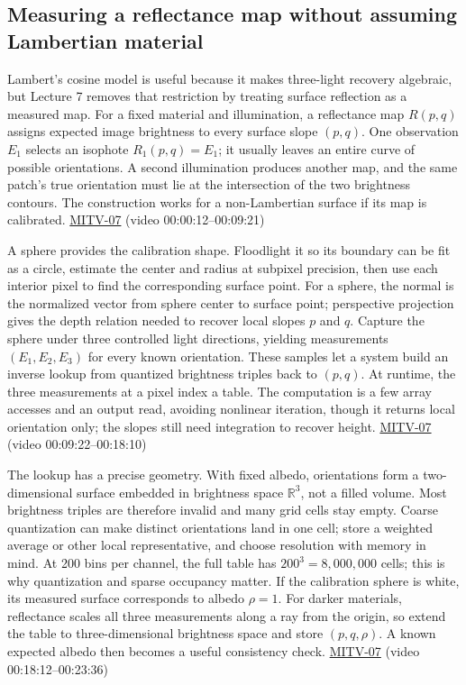 \subsection{Measuring a reflectance map without assuming Lambertian material}\label{04-visual-computing-ii-ch032-measuring-a-reflectance-map-without-assuming-lambertian-material}

Lambert's cosine model is useful because it makes three-light recovery algebraic, but Lecture 7 removes that restriction by treating surface reflection as a measured map. For a fixed material and illumination, a reflectance map \(R(p,q)\) assigns expected image brightness to every surface slope \((p,q)\). One observation \(E_1\) selects an isophote \(R_1(p,q)=E_1\); it usually leaves an entire curve of possible orientations. A second illumination produces another map, and the same patch's true orientation must lie at the intersection of the two brightness contours. The construction works for a non-Lambertian surface if its map is calibrated. \hyperref[04-visual-computing-ii-ch036-mitv-07---gradient-space-reflectance-map-image-irradiance-equation-gnomonic-projection]{MITV-07} (video 00:00:12--00:09:21)

A sphere provides the calibration shape. Floodlight it so its boundary can be fit as a circle, estimate the center and radius at subpixel precision, then use each interior pixel to find the corresponding surface point. For a sphere, the normal is the normalized vector from sphere center to surface point; perspective projection gives the depth relation needed to recover local slopes \(p\) and \(q\). Capture the sphere under three controlled light directions, yielding measurements \((E_1,E_2,E_3)\) for every known orientation. These samples let a system build an inverse lookup from quantized brightness triples back to \((p,q)\). At runtime, the three measurements at a pixel index a table. The computation is a few array accesses and an output read, avoiding nonlinear iteration, though it returns local orientation only; the slopes still need integration to recover height. \hyperref[04-visual-computing-ii-ch036-mitv-07---gradient-space-reflectance-map-image-irradiance-equation-gnomonic-projection]{MITV-07} (video 00:09:22--00:18:10)

The lookup has a precise geometry. With fixed albedo, orientations form a two-dimensional surface embedded in brightness space \(\mathbb R^3\), not a filled volume. Most brightness triples are therefore invalid and many grid cells stay empty. Coarse quantization can make distinct orientations land in one cell; store a weighted average or other local representative, and choose resolution with memory in mind. At 200 bins per channel, the full table has \(200^3=8{,}000{,}000\) cells; this is why quantization and sparse occupancy matter. If the calibration sphere is white, its measured surface corresponds to albedo \(\rho=1\). For darker materials, reflectance scales all three measurements along a ray from the origin, so extend the table to three-dimensional brightness space and store \((p,q,\rho)\). A known expected albedo then becomes a useful consistency check. \hyperref[04-visual-computing-ii-ch036-mitv-07---gradient-space-reflectance-map-image-irradiance-equation-gnomonic-projection]{MITV-07} (video 00:18:12--00:23:36)

